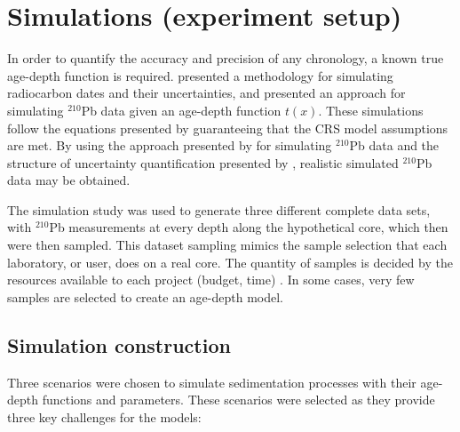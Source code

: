 \documentclass [10pt] {article}
\begin{document}



\section{Simulations (experiment setup)}

	In order to quantify the accuracy and precision of any chronology, a known true age-depth function is required.
\citet{Blaauw2018} presented a methodology for simulating radiocarbon dates and their uncertainties, and \citet{Aquino2018} presented an approach for simulating $^{210}$Pb data given an age-depth function $t(x)$.
These simulations follow the equations presented by \cite{Appleby1978, Robbins1978} guaranteeing that the CRS model assumptions are met. 
By using the approach presented by \citet{Aquino2018} for simulating $^{210}$Pb data and the structure of uncertainty quantification presented by \citet{Blaauw2018}, realistic simulated $^{210}$Pb data may be obtained.

The simulation study was used to generate three different complete data sets, with $^{210}$Pb measurements at every depth along the hypothetical core, which then were then sampled. This dataset sampling mimics the sample selection that each laboratory, or user, does on a real core. The quantity of samples is decided by the resources available to each project (budget, time) \citet{Blaauw2018}. 
In some cases, very few samples are selected to create an age-depth model.

\subsection{Simulation construction}\label{sec:SimConst}

Three scenarios were chosen to simulate sedimentation processes with their age-depth functions and parameters. These scenarios were selected as they provide three key challenges for the models:
\end{document}
